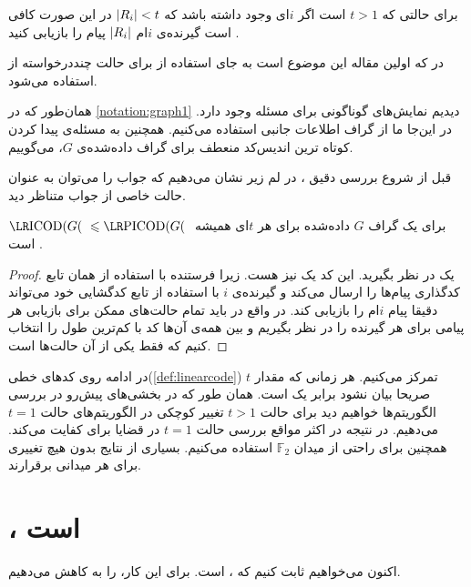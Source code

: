 \begin{note}
    برای حالتی که
    $t > 1$
    است اگر
    $i$ای وجود داشته باشد که
    $\left|{R_i}\right| < t$
    در این صورت کافی است گیرنده‌ی
    $i$ام
    $\left|{R_i}\right|$
    پیام را بازیابی کنید \cite{pliablefirstpaper}.
\end{note}

\begin{note}
    در
    \cite{pliablefirstpaper}
    که اولین مقاله این موضوع است به جای استفاده از
    \picodt
    برای حالت چنددرخواسته از
    استفاده می‌شود.
\end{note}
\begin{notation}
    همان‌طور که در
    \autoref{notation:graph1}
    دیدیم نمایش‌های گوناگونی برای مسئله وجود دارد. در این‌جا ما از گراف اطلاعات جانبی استفاده می‌کنیم. همچنین به مسئله‌ی پیدا کردن کوتاه ترین اندیس‌کد منعطف برای گراف داده‌شده‌ی
    $G$،
    \picodg
    می‌گوییم.
\end{notation}

قبل از شروع بررسی دقیق \picods، در لم زیر نشان می‌دهیم که جواب \picod را می‌توان به عنوان حالت خاصی از جواب \icod متناظر دید.
\begin{lemma}
    برای یک گراف
    $G$
    داده‌شده برای هر
    $t$ای همیشه
    $\icodg \leq \picodg$
    است \cite{pliablefirstpaper}.
\end{lemma}
\begin{proof}
    یک
    \icod
    در نظر بگیرید. این کد یک
    \picod
    نیز هست. زیرا فرستنده با استفاده از همان تابع کدگذاری پیام‌ها را ارسال می‌کند و گیرنده‌ی
    $i$
    با استفاده از تابع کدگشایی خود می‌تواند دقیقا پیام
    $i$ام را بازیابی کند. در واقع در
    \picod
    باید تمام حالت‌های ممکن برای بازیابی هر پیامی برای هر گیرنده را در نظر بگیریم و بین همه‌ی آن‌ها کد با کم‌ترین طول را انتخاب کنیم که
    \icod
    فقط یکی از آن حالت‌ها است.
\end{proof}


در ادامه روی کدهای خطی(\autoref{def:linearcode}) تمرکز می‌کنیم. هر زمانی که مقدار
$t$
صریحا بیان نشود برابر یک است. همان طور که در بخشی‌های پیش‌رو در بررسی الگوریتم‌ها خواهیم دید برای حالت
$t > 1$
تغییر کوچکی در الگوریتم‌های حالت
$t = 1$
می‌دهیم. در نتیجه در اکثر مواقع بررسی حالت
$t = 1$
در قضایا برای کفایت می‌کند. همچنین برای راحتی از میدان
$\mathbb{F}_2$
استفاده می‌کنیم. بسیاری از نتایج بدون هیچ تغییری برای هر میدانی برقرارند.

\section{\lpicod،
\nphard
است}
اکنون می‌خواهیم ثابت کنیم که
،
\nphard
است. برای این کار،
\lpicod
را به
کاهش می‌دهیم.

